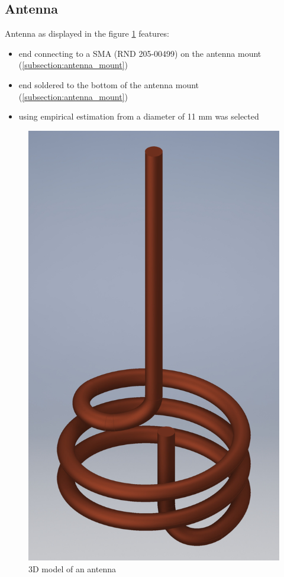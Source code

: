 \clearpage
\subsection{Antenna}
\label{subsection:antenna}
Antenna as displayed in the figure \ref{fig:antenna} features:
\begin{itemize}
	\item end connecting to a SMA (RND 205-00499) on the antenna mount (\ref{subsection:antenna_mount})
	\item end soldered to the bottom of the antenna mount (\ref{subsection:antenna_mount})
	\item using empirical estimation from \cite{Siverns2012} a diameter of 11 mm was selected
\end{itemize}

\begin{figure}[h]
	\centering
	\includegraphics[width=.71\textwidth]{images/antenna_small}
	\caption{3D model of an antenna}
	\label{fig:antenna}
\end{figure}
